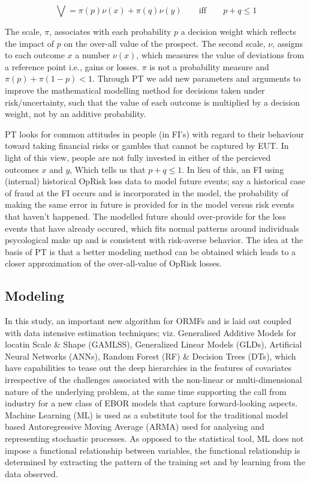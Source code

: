 \documentclass[]{DissertateUSU}
\begin{document}
\begin{equation}\label{eqn2}
\mathbf{\bigvee}=\pi(p)\nu(x)+\pi(q)\nu(y) \qquad\mbox{iff} \qquad p+q \leq 1
\end{equation}

The scale, \(\pi\), associates with each probability \(p\) a decision
weight which reflects the impact of \(p\) on the over-all value of the
prospect. The second scale, \(\nu\), assigns to each outcome \(x\) a
number \(\nu(x)\), which measures the value of deviations from a
reference point i.e., gains or losses. \(\pi\) is not a probability
measure and \(\pi(p) + \pi(1-p) < 1\). Through PT we add new parameters
and arguments to improve the mathematical modelling method for decisions
taken under risk/uncertainty, such that the value of each outcome is
multiplied by a decision weight, not by an additive probability.

PT looks for common attitudes in people (in FI's) with regard to their
behaviour toward taking financial risks or gambles that cannot be
captured by EUT. In light of this view, people are not fully invested in
either of the percieved outcomes \(x\) and \(y\), Which tells us that
\(p+q \leq 1\). In lieu of this, an FI using (internal) historical
OpRisk loss data to model future events; say a historical case of fraud
at the FI occurs and is incorporated in the model, the probability of
making the same error in future is provided for in the model versus risk
events that haven't happened. The modelled future should over-provide
for the loss events that have already occured, which fits normal
patterns around individuals psycological make up and is consistent with
risk-averse behavior. The idea at the basis of PT is that a better
modeling method can be obtained which leads to a closer approximation of
the over-all-value of OpRisk losses.

\subsection{Modeling}

In this study, an important new algorithm for ORMFs and is laid out
coupled with data intensive estimation techniques; viz. Generalised
Additive Models for locatin Scale \& Shape (GAMLSS), Generalized Linear
Models (GLDs), Artificial Neural Networks (ANNs), Random Forest (RF) \&
Decision Trees (DTs), which have capabilities to tease out the deep
hierarchies in the features of covariates irrespective of the challenges
associated with the non-linear or multi-dimensional nature of the
underlying problem, at the same time supporting the call from industry
for a new class of EBOR models that capture forward-looking aspects.
Machine Learning (ML) is used as a substitute tool for the traditional
model based Autoregressive Moving Average (ARMA) used for analysing and
representing stochastic processes. As opposed to the statistical tool,
ML does not impose a functional relationship between variables, the
functional relationship is determined by extracting the pattern of the
training set and by learning from the data observed.\medskip 
\end{document}
